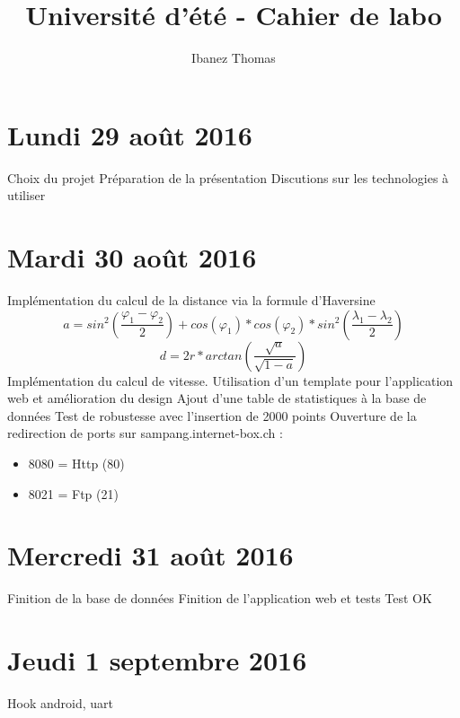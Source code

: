 \documentclass[a4paper,11pt]{article}
\title{Université d'été - Cahier de labo}
\author{Ibanez Thomas}
\begin{document}
\maketitle
\section{Lundi 29 août 2016}
Choix du projet
Préparation de la présentation
Discutions sur les technologies à utiliser

\section{Mardi 30 août 2016}
Implémentation du calcul de la distance via la formule d'Haversine
\begin{equation*}
a = sin^2(\frac{\varphi_1 - \varphi_2}{2}) + cos(\varphi_1) * cos(\varphi_2) * sin^2(\frac{\lambda_1 - \lambda_2}{2})
\end{equation*}
\begin{equation*}
d = 2r *arctan\left(\frac{\sqrt{a}}{\sqrt{1-a}}\right)
\end{equation*}
Implémentation du calcul de vitesse. \newline
Utilisation d'un template pour l'application web et amélioration du design
Ajout d'une table de statistiques à la base de données \newline
Test de robustesse avec l'insertion de 2000 points \newline
Ouverture de la redirection de ports sur sampang.internet-box.ch :
\begin{itemize}
\item 8080 = Http (80)
\item 8021 = Ftp (21)
\end{itemize}
\section{Mercredi 31 août 2016}
Finition de la base de données\newline
Finition de l'application web et tests\newline
Test OK
\section{Jeudi 1 septembre 2016}
Hook android, uart 
\end{document}
